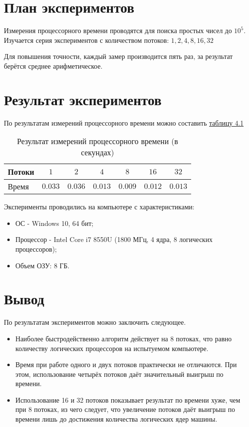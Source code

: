 \section{План экспериментов}
Измерения процессорного времени проводятся для поиска простых чисел до $10^{5}$. Изучается серия экспериментов с количеством потоков: $1, 2, 4, 8, 16, 32$

Для повышения точности, каждый замер производится пять раз, за результат берётся среднее арифметическое.

\section{Результат экспериментов}
По результатам измерений процессорного времени можно составить \hyperref[table_4_1]{таблицу 4.1}

\begin{table}[h] \label{table_4_1}
\caption{Результат измерений процессорного времени (в секундах)}
\begin{tabular}{| p{3.0cm} | c | c | c | c | c | c |}
	\hline
	Потоки			&$1$		&$2$		&$4$		&$8$		&$16$		&$32$		\\
	\hline\hline
	Время			&$0.033$	&$0.036$	&$0.013$	&$0.009$	&$0.012$	&$0.013$	\\
	\hline
\end{tabular}
\end{table}


Эксперименты проводились на компьютере с характеристиками:
\begin{itemize}
	\item ОС - Windows 10, 64 бит;
	\item Процессор -  Intel Core i7 8550U (1800 МГц, 4 ядра, 8 логических процессоров);
	\item Объем ОЗУ: 8 ГБ.
\end{itemize}

\section{Вывод}
По результатам экспериментов можно заключить следующее.
\begin{itemize}
	\item Наиболее быстродейственно алгоритм действует на 8 потоках, что равно количеству логических процессоров на испытуемом компьютере.
	\item Время при работе одного и двух потоков практически не отличаются. При этом, использование четырёх потоков даёт значительный выигрыш по времени.
	\item Использование 16 и 32 потоков показывает результат по времени хуже, чем при 8 потоках, из чего следует, что увеличение потоков даёт выигрыш по времени лишь до достижения количества логических ядер машины.
\end{itemize}


	